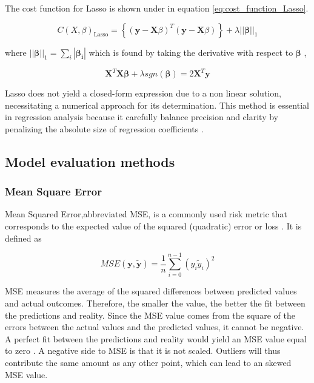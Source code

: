 \noindent The cost function for Lasso is shown under in equation \ref{eq:cost_function_Lasso}. 

\begin{equation}\label{eq:cost_function_Lasso}
    C(X,\beta)_\text{Lasso} =  \left\lbrace ( \textbf{y} - \textbf{X}\beta )^T (\textbf{y} - \textbf{X}\beta)\right\rbrace + \lambda||\boldsymbol{\beta}||_1  
\end{equation}

\noindent where $||\boldsymbol{\beta}||_1 = \sum_{i} |\boldsymbol{\beta_i}|$ which is found by taking the derivative with respect to $\boldsymbol{\beta}$ \cite{SpringerCh3}, 

\begin{equation}\label{eq:optimal_lasso}
    \mathbf{X}^T\mathbf{X}\boldsymbol{\beta} + \lambda sgn(\boldsymbol{\beta}) = 2\mathbf{X}^T\boldsymbol{y} 
\end{equation}

\noindent Lasso does not yield a closed-form expression due to a non linear solution, necessitating a numerical approach for its
determination. 
This method is essential in regression analysis because it carefully balance precision and clarity by penalizing the absolute size of
regression coefficients \cite{Wessel}.

\subsection{Model evaluation methods}
\subsubsection{Mean Square Error}

\noindent Mean Squared Error,abbreviated MSE, is a commonly used risk metric that corresponds to the expected value of the squared (quadratic) error or loss \cite{Week34}. It is defined as 

\begin{equation}\label{eq:MSE} 
 MSE(\boldsymbol{y},\tilde{\boldsymbol{y}}) = \frac{1}{n} \sum_{i=0}^{n-1}(y_i \tilde{y}_i)^2
\end{equation}

\noindent MSE measures the average of the squared differences between predicted values and actual outcomes. Therefore, the smaller the
value, the better the fit between the predictions and reality. Since the MSE value comes from the square of the errors between the actual
values and the predicted values, it cannot be negative. A perfect fit between the predictions and reality would yield an MSE value equal
to zero \cite{Week34}. A negative side to MSE is that it is not scaled. Outliers will thus contribute the same amount as any other point,
which can lead to an skewed MSE value. 

